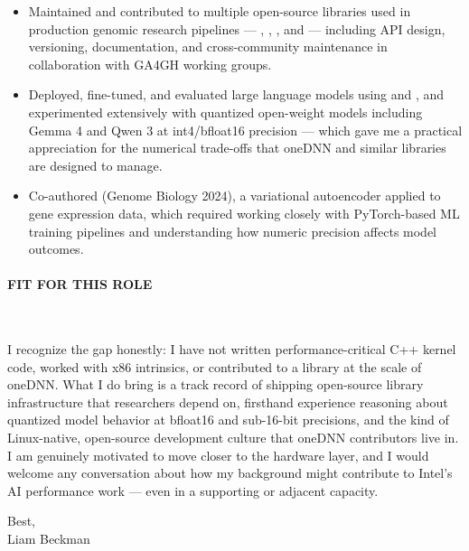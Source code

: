 \begin{itemize}

\item Maintained and contributed to multiple open-source libraries used in production genomic research pipelines --- , , , and  --- including API design, versioning, documentation, and cross-community maintenance in collaboration with GA4GH working groups.

\item Deployed, fine-tuned, and evaluated large language models using  and , and experimented extensively with quantized open-weight models including Gemma 4 and Qwen 3 at int4/bfloat16 precision --- which gave me a practical appreciation for the numerical trade-offs that oneDNN and similar libraries are designed to manage.

\item Co-authored  (Genome Biology 2024), a variational autoencoder applied to gene expression data, which required working closely with PyTorch-based ML training pipelines and understanding how numeric precision affects model outcomes.

\end{itemize}

\paragraph{FIT FOR THIS ROLE}\

\vspace*{\baselineskip}

I recognize the gap honestly: I have not written performance-critical C++ kernel code, worked with x86 intrinsics, or contributed to a library at the scale of oneDNN. What I do bring is a track record of shipping open-source library infrastructure that researchers depend on, firsthand experience reasoning about quantized model behavior at bfloat16 and sub-16-bit precisions, and the kind of Linux-native, open-source development culture that oneDNN contributors live in. I am genuinely motivated to move closer to the hardware layer, and I would welcome any conversation about how my background might contribute to Intel's AI performance work --- even in a supporting or adjacent capacity.

\vspace*{\baselineskip}

Best,\\

Liam Beckman

\vfill \myBreak{}



